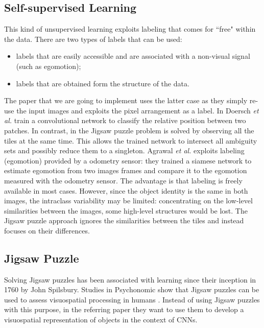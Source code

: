 \subsection{Self-supervised Learning}
This kind of unsupervised learning exploits labeling that comes for \textquotedblleft free" within the data. There are two types of labels that can be used:
\begin{itemize}
    \item labels that are easily accessible and are associated with a non-visual signal (such as egomotion);
    \item labels that are obtained form the structure of the data.
\end{itemize}
The paper that we are going to implement uses the latter case as they simply re-use the input images and exploits the pixel arrangement as a label.\newline
In \cite{context_prediction} Doersch \textit{et al.} train a convolutional network to classify the relative position between two patches. In contrast, in \cite{Noroozi_2016} the Jigsaw puzzle problem is solved by observing all the tiles at the same time. This allows the trained network to intersect all ambiguity sets and possibly reduce them to a singleton.
Agrawal \textit{et al.} \cite{learning_by_moving} exploits labeling (egomotion) provided by a odometry sensor: they trained a siamese network to estimate egomotion from two images frames and compare it to the egomotion measured with the odometry sensor. The advantage is that labeling is freely available in most cases. However, since the object identity is the same in both images, the intraclass variability may be limited: concentrating on the low-level similarities between the images, some high-level structures would be lost. The Jigsaw puzzle approach ignores the similarities between the tiles and instead focuses on their differences.

\subsection{Jigsaw Puzzle}
Solving Jigsaw puzzles has been associated with learning since their inception in 1760 by John Spilsbury. Studies in Psychonomic show that Jigsaw puzzles can be used to assess visuospatial processing in humans \cite{assessing_visuospatial_processes}. Instead of using Jigsaw puzzles with this purpose, in the referring paper they want to use them to develop a visuospatial representation of objects in the context of CNNs.
